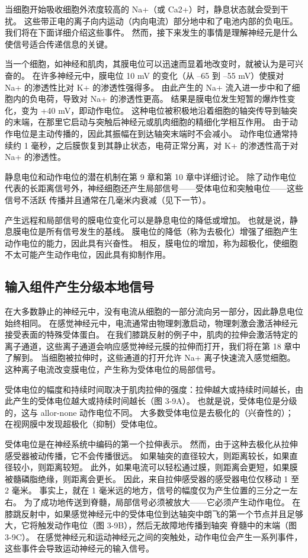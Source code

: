 当细胞开始吸收细胞外浓度较高的 Na+（或 Ca2+）时，静息状态就会受到干扰。 
这些带正电的离子向内运动（内向电流）部分地中和了电池内部的负电压。 
我们将在下面详细介绍这些事件。 
然而，接下来发生的事情是理解神经元是什么使信号适合传递信息的关键。


当一个细胞，如神经和肌肉，其膜电位可以迅速而显着地改变时，就被认为是可兴奋的。 
在许多神经元中，膜电位 10 mV 的变化（从 –65 到 –55 mV）使膜对 Na+ 的渗透性比对 K+ 的渗透性强得多。 
由此产生的 Na+ 流入进一步中和了细胞内的负电荷，导致对 Na+ 的渗透性更高。 
结果是膜电位发生短暂的爆炸性变化，变为 +40 mV，即动作电位。 
这种电位被积极地沿着细胞的轴突传导到轴突的末端，在那里它启动与突触后神经元或肌肉细胞的精细化学相互作用。 
由于动作电位是主动传播的，因此其振幅在到达轴突末端时不会减小。 
动作电位通常持续约 1 毫秒，之后膜恢复到其静止状态，电荷正常分离，对 K+ 的渗透性高于对 Na+ 的渗透性。


静息电位和动作电位的潜在机制在第 9 章和第 10 章中详细讨论。
除了动作电位代表的长距离信号外，神经细胞还产生局部信号——受体电位和突触电位——这些信号不活跃 传播并且通常在几毫米内衰减（见下一节）。


产生远程和局部信号的膜电位变化可以是静息电位的降低或增加。 
也就是说，静息膜电位是所有信号发生的基线。 
膜电位的降低（称为去极化）增强了细胞产生动作电位的能力，因此具有兴奋性。 
相反，膜电位的增加，称为超极化，使细胞不太可能产生动作电位，因此具有抑制作用。


\subsection{输入组件产生分级本地信号}
在大多数静止的神经元中，没有电流从细胞的一部分流向另一部分，因此静息电位始终相同。 
在感觉神经元中，电流通常由物理刺激启动，物理刺激会激活神经元接受表面的特殊受体蛋白。 
在我们膝跳反射的例子中，肌肉的拉伸会激活特定的离子通道，这些离子通道会响应感觉神经元膜的拉伸而打开，我们将在第 18 章中了解到。
当细胞被拉伸时，这些通道的打开允许 Na+ 离子快速流入感觉细胞。 
这种离子电流改变膜电位，产生称为受体电位的局部信号。


受体电位的幅度和持续时间取决于肌肉拉伸的强度：拉伸越大或持续时间越长，由此产生的受体电位越大或持续时间越长（图 3-9A）。 
也就是说，受体电位是分级的，这与 allor-none 动作电位不同。 
大多数受体电位是去极化的（兴奋性的）； 在视网膜中发现超极化（抑制）受体电位。


受体电位是在神经系统中编码的第一个拉伸表示。 
然而，由于这种去极化从拉伸感受器被动传播，它不会传播很远。 
如果轴突的直径较大，则距离较长，如果直径较小，则距离较短。 
此外，如果电流可以轻松通过膜，则距离会更短，如果膜被髓磷脂绝缘，则距离会更长。 
因此，来自拉伸感受器的感受器电位仅移动 1 至 2 毫米。 
事实上，就在 1 毫米远的地方，信号的幅度仅为产生位置的三分之一左右。 
为了成功地传送到脊髓，局部信号必须被放大——它必须产生动作电位。 
在膝跳反射中，如果感觉神经元中的受体电位到达轴突中朗飞的第一个节点并且足够大，它将触发动作电位（图 3-9B），然后无故障地传播到轴突 脊髓中的末端（图 3-9C）。 
在感觉神经元和运动神经元之间的突触处，动作电位会产生一系列事件，这些事件会导致运动神经元的输入信号。


